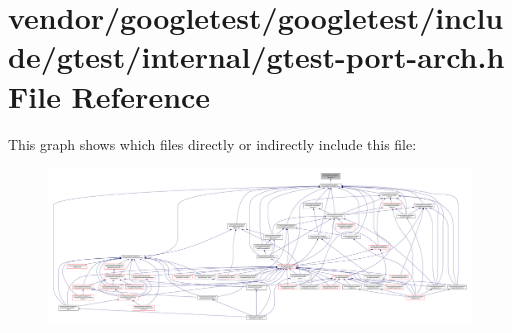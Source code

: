 \hypertarget{gtest-port-arch_8h}{}\section{vendor/googletest/googletest/include/gtest/internal/gtest-\/port-\/arch.h File Reference}
\label{gtest-port-arch_8h}
This graph shows which files directly or indirectly include this file\+:\nopagebreak
\begin{figure}[H]
\begin{center}
\leavevmode
\includegraphics[width=350pt]{gtest-port-arch_8h__dep__incl}
\end{center}
\end{figure}
